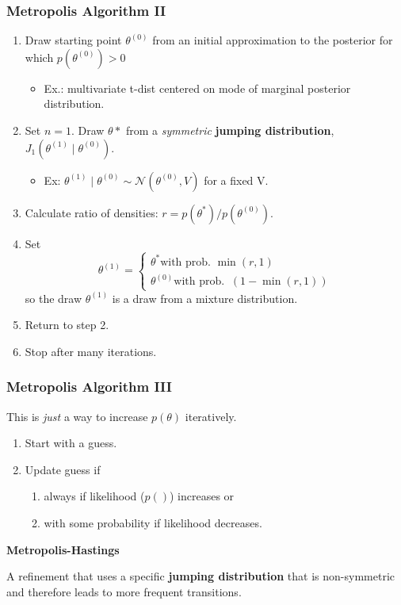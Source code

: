 \documentclass[11pt, aspectratio=169]{beamer}
\newcommand{\Skip}{\vspace{1em}}
\begin{document}
\begin{frame}[c]\frametitle{Metropolis Algorithm II}
    
\begin{enumerate}
  \item Draw starting point $\theta^{(0)}$ from an initial approximation to the posterior for which  $p(\theta^{(0)})>0$ 
  \begin{itemize}
    \item Ex.: multivariate t-dist centered on mode of marginal posterior distribution.
  \end{itemize}
  \item Set $n=1$. Draw $\theta*$ from a \emph{symmetric} \textbf{jumping distribution}, $J_1(\theta^{(1)} \mid \theta^{(0)})$. 
  \begin{itemize}
    \item Ex: $\theta^{(1)} \mid \theta^{(0)}\sim \mathcal{N}(\theta^{(0)}, V)$ for a fixed V. 
  \end{itemize}
  \item Calculate ratio of densities: $r = p(\theta^*)/p(\theta^{(0)})$.
  \item Set $$\theta^{(1)} = \begin{cases} \theta^* \text{with prob.}\,\, \min(r,1) \\
          \theta^{(0)} \text{with prob.}\,\,\ (1-\min(r,1)) \end{cases}$$
          so the draw $\theta^{(1)}$ is a draw from a mixture distribution. 
  \item Return to step 2.
  \item Stop after many iterations. 

\end{enumerate}

\end{frame}


\begin{frame}[c]\frametitle{Metropolis Algorithm III}
    
This is \emph{just} a way to increase $p(\theta)$ iteratively. 

\Skip
\begin{enumerate}
  \item Start with a guess. 
  \item Update guess if 
  \begin{enumerate}
    \item always if likelihood ($p()$) increases or  
    \item with some probability if likelihood decreases. 
  \end{enumerate}
\end{enumerate}

\Skip
\textbf{Metropolis-Hastings}

\Skip
A refinement that uses a specific \textbf{jumping distribution} that is non-symmetric and therefore leads to more frequent transitions. 


\end{frame}
\end{document}
